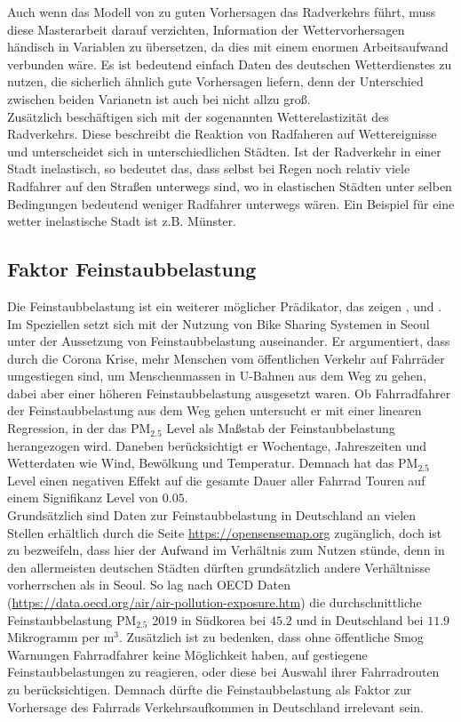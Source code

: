 \documentclass[a4paper,12pt]{thesis}
\begin{document}
Auch wenn das Modell von \cite{Wessel2020} zu guten Vorhersagen das Radverkehrs führt, muss diese Masterarbeit darauf verzichten, Information der Wettervorhersagen händisch in Variablen zu übersetzen, da dies mit einem enormen Arbeitsaufwand verbunden wäre. Es ist bedeutend einfach Daten des deutschen Wetterdienstes zu nutzen, die sicherlich ähnlich gute Vorhersagen liefern, denn der Unterschied zwischen beiden Varianetn ist auch bei \cite{Wessel2020} nicht allzu groß.\\
Zusätzlich beschäftigen sich \cite{Goldmann2021} mit der sogenannten Wetterelastizität des Radverkehrs. Diese beschreibt die Reaktion von Radfaheren auf Wettereignisse und unterscheidet sich in unterschiedlichen Städten. Ist der Radverkehr in einer Stadt inelastisch, so bedeutet das, dass selbst bei Regen noch relativ viele Radfahrer auf den Straßen unterwegs sind, wo in elastischen Städten unter selben Bedingungen bedeutend weniger Radfahrer unterwegs wären. Ein Beispiel für eine wetter inelastische Stadt ist z.B. Münster. 


\subsection{Faktor Feinstaubbelastung}

Die Feinstaubbelastung ist ein weiterer möglicher Prädikator, das zeigen \cite{ZHAO2018826}, \cite{Gao2022} und \cite{Hong2022}. Im Speziellen setzt sich \cite{Hong2022} mit der Nutzung von Bike Sharing Systemen in Seoul unter der Aussetzung von Feinstaubbelastung auseinander. Er argumentiert, dass durch die Corona Krise, mehr Menschen vom öffentlichen Verkehr auf Fahrräder umgestiegen sind, um Menschenmassen in U-Bahnen aus dem Weg zu gehen, dabei aber einer höheren Feinstaubbelastung ausgesetzt waren. Ob Fahrradfahrer der Feinstaubbelastung aus dem Weg gehen untersucht er mit einer linearen Regression, in der das PM$_{2.5}$ Level als Maßstab der Feinstaubbelastung herangezogen wird. Daneben berücksichtigt er Wochentage, Jahreszeiten und Wetterdaten wie Wind, Bewölkung und Temperatur. Demnach hat das PM$_{2.5}$ Level einen negativen Effekt auf die gesamte Dauer aller Fahrrad Touren auf einem Signifikanz Level von $0.05$.\\
Grundsätzlich sind Daten zur Feinstaubbelastung in Deutschland an vielen Stellen erhältlich durch die Seite \url{https://opensensemap.org} zugänglich, doch ist zu bezweifeln, dass hier der Aufwand im Verhältnis zum Nutzen stünde, denn in den allermeisten deutschen Städten dürften grundsätzlich andere Verhältnisse vorherrschen als in Seoul. So lag nach OECD Daten (\url{https://data.oecd.org/air/air-pollution-exposure.htm}) die durchschnittliche Feinstaubbelastung PM$_{2.5}$ 2019 in Südkorea bei $45.2$ und in Deutschland bei $11.9$ Mikrogramm per m$^3$. Zusätzlich ist zu bedenken, dass ohne öffentliche Smog Warnungen Fahrradfahrer keine Möglichkeit haben, auf gestiegene Feinstaubbelastungen zu reagieren, oder diese bei Auswahl ihrer Fahrradrouten zu berücksichtigen. Demnach dürfte die Feinstaubbelastung als Faktor zur Vorhersage des Fahrrads Verkehrsaufkommen in Deutschland irrelevant sein.
\end{document}
